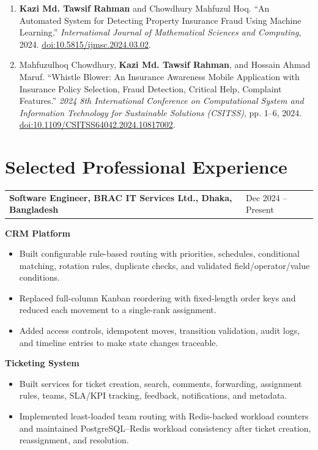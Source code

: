 \documentclass[11pt,letterpaper]{article}
\makeatletter
\newcommand{\entry}[2]{%
  \begin{tabularx}{\textwidth}{@{}X >{\raggedleft\arraybackslash}p{0.19\textwidth}@{}}
    \textbf{#1} & #2
  \end{tabularx}\par
}
\makeatother
\begin{document}
\begin{enumerate}
  \item \textbf{Kazi Md. Tawsif Rahman} and Chowdhury Mahfuzul Hoq.
  ``An Automated System for Detecting Property Insurance Fraud Using Machine
  Learning.'' \textit{International Journal of Mathematical Sciences and
  Computing}, 2024.
  \href{https://doi.org/10.5815/ijmsc.2024.03.02}{doi:10.5815/ijmsc.2024.03.02}.
  \par\smallskip

  \item Mahfuzulhoq Chowdhury, \textbf{Kazi Md. Tawsif Rahman}, and Hossain
  Ahmad Maruf. ``Whistle Blower: An Insurance Awareness Mobile Application with
  Insurance Policy Selection, Fraud Detection, Critical Help, Complaint
  Features.'' \textit{2024 8th International Conference on Computational System
  and Information Technology for Sustainable Solutions (CSITSS)}, pp. 1--6,
  2024.
  \href{https://doi.org/10.1109/CSITSS64042.2024.10817002}{doi:10.1109/CSITSS64042.2024.10817002}.
\end{enumerate}

\section*{Selected Professional Experience}

\entry{Software Engineer, BRAC IT Services Ltd., Dhaka, Bangladesh}{Dec 2024 -- Present}
\textbf{CRM Platform}
\begin{itemize}
  \item Built configurable rule-based routing with priorities, schedules,
  conditional matching, rotation rules, duplicate checks, and validated
  field/operator/value conditions.

  \item Replaced full-column Kanban reordering with fixed-length order keys and
  reduced each movement to a single-rank assignment.

  \item Added access controls, idempotent moves, transition validation, audit
  logs, and timeline entries to make state changes traceable.
\end{itemize}

\textbf{Ticketing System}
\begin{itemize}
  \item Built services for ticket creation, search, comments, forwarding,
  assignment rules, teams, SLA/KPI tracking, feedback, notifications, and
  metadata.

  \item Implemented least-loaded team routing with Redis-backed workload
  counters and maintained PostgreSQL--Redis workload consistency after ticket
  creation, reassignment, and resolution.
\end{itemize}
\end{document}
